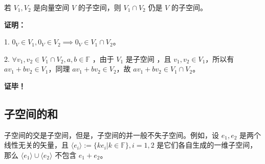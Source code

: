 \begin{theorem}{}\label{the_SubSpc_1}
若 $V_1, V_2$ 是向量空间 $V$ 的子空间，则 $V_1 \cap V_2$ 仍是 $V$ 的子空间。
\end{theorem}
\textbf{证明：}

1. $0_V \in V_1, 0_V \in V_2 \implies 0_V \in V_1 \cap V_2$。

2. $\forall v_1,v_2 \in V_1 \cap V_2, a, b \in \mathbb{F}$ ，由于 $V_1$ 是子空间 ，且 $v_1, v_2 \in V_1$，所以有 $a v_1 + b v_2 \in V_1$，同理 $a v_1 + b v_2 \in V_2$，故 $a v_1 + b v_2 \in V_1 \cap V_2$。

\textbf{证毕！}

\subsection{子空间的和}
子空间的交是子空间，但是，子空间的并一般不失子空间。例如，设 $e_1,e_2$ 是两个线性无关的矢量，且 $\langle e_i\rangle:=\{k e_i|k\in\mathbb F\},i=1,2$ 是它们各自生成的一维子空间，那么 $\langle e_1\rangle\cup \langle e_2\rangle$ 不包含 $e_1+e_2$。
\begin{definition}{}

\end{definition}
